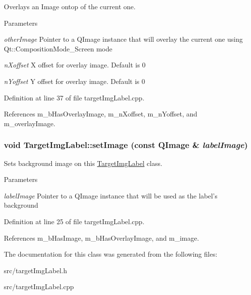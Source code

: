 Overlays an Image ontop of the current one. 
\begin{DoxyParams}{Parameters}
\item[{\em otherImage}]Pointer to a QImage instance that will overlay the current one using Qt::CompositionMode\_\-Screen mode \item[{\em nXoffset}]X offset for overlay image. Default is 0 \item[{\em nYoffset}]Y offset for overlay image. Default is 0 \end{DoxyParams}


Definition at line 37 of file targetImgLabel.cpp.

References m\_\-bHasOverlayImage, m\_\-nXoffset, m\_\-nYoffset, and m\_\-overlayImage.\hypertarget{classTargetImgLabel_a2ec40d8850e3d9cc4d5c9984412c0cfb}{
\subsubsection[{setImage}]{\setlength{\rightskip}{0pt plus 5cm}void TargetImgLabel::setImage (const QImage \& {\em labelImage})}}
\label{classTargetImgLabel_a2ec40d8850e3d9cc4d5c9984412c0cfb}


Sets background image on this \hyperlink{classTargetImgLabel}{TargetImgLabel} class. 
\begin{DoxyParams}{Parameters}
\item[{\em labelImage}]Pointer to a QImage instance that will be used as the label's background \end{DoxyParams}


Definition at line 25 of file targetImgLabel.cpp.

References m\_\-bHasImage, m\_\-bHasOverlayImage, and m\_\-image.

The documentation for this class was generated from the following files:\begin{DoxyCompactItemize}
\item 
src/targetImgLabel.h\item 
src/targetImgLabel.cpp\end{DoxyCompactItemize}
